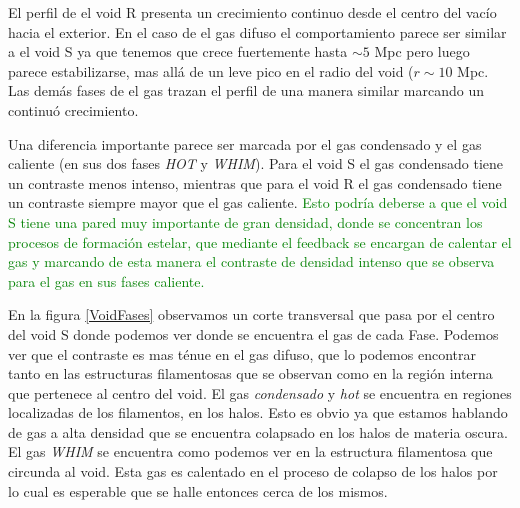El perfil de el void R presenta un crecimiento continuo desde el centro del vac\'io hacia el exterior. En el caso de el gas difuso el comportamiento parece ser similar a el void S ya que tenemos que crece fuertemente hasta $\sim 5$ Mpc pero luego parece estabilizarse, mas all\'a de un leve pico en el radio del void ($r\sim10$ Mpc. Las dem\'as fases de el gas trazan el perfil de una manera similar marcando un continu\'o crecimiento. 

Una diferencia importante parece ser marcada por el gas condensado y el gas caliente (en sus dos fases \textit{HOT} y \textit{WHIM}). Para el void S el gas condensado tiene un contraste menos intenso, mientras que para el void R el gas condensado tiene un contraste siempre mayor que el gas caliente. \textcolor{green}{Esto podr\'ia deberse a que el void S tiene una pared muy importante de gran densidad, donde se concentran los procesos de formaci\'on estelar, que mediante el feedback se encargan de calentar el gas y marcando de esta manera el contraste de densidad intenso que se observa para el gas en sus fases caliente.}

En la figura \ref{VoidFases} observamos un corte transversal que pasa por el centro del void S donde podemos ver donde se encuentra el gas de cada Fase. Podemos ver que el contraste es mas t\'enue en el gas difuso, que lo podemos encontrar tanto en las estructuras filamentosas que se observan como en la regi\'on interna que pertenece al centro del void. El gas \textit{condensado} y \textit{hot} se encuentra en regiones localizadas de los filamentos, en los halos. Esto es obvio ya que estamos hablando de gas a alta densidad que se encuentra colapsado en los halos de materia oscura. El gas \textit{WHIM} se encuentra como podemos ver en la estructura filamentosa que circunda al void. Esta gas es calentado en el proceso de colapso de los halos por lo cual es esperable que se halle entonces cerca de los mismos. 

